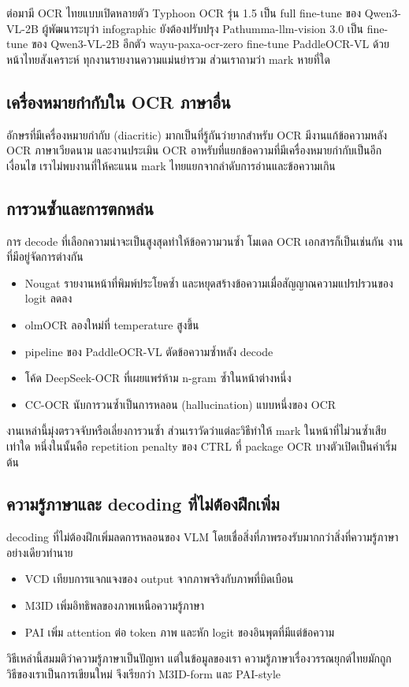 ต่อมามี OCR ไทยแบบเปิดหลายตัว Typhoon OCR \cite{nonesung2026typhoonocr} รุ่น 1.5 เป็น full fine-tune ของ Qwen3-VL-2B \cite{bai2025qwen3vl} ผู้พัฒนาระบุว่า infographic ยังต้องปรับปรุง Pathumma-llm-vision 3.0 \cite{nectec2026pathumma} เป็น fine-tune ของ Qwen3-VL-2B อีกตัว wayu-paxa-ocr-zero \cite{pipatanakul2026synthetic} fine-tune PaddleOCR-VL \cite{cui2025paddleocrvl} ด้วยหน้าไทยสังเคราะห์ ทุกงานรายงานความแม่นยำรวม ส่วนเราถามว่า mark หายที่ใด

\subsection{เครื่องหมายกำกับใน OCR ภาษาอื่น}
อักษรที่มีเครื่องหมายกำกับ (diacritic) มากเป็นที่รู้กันว่ายากสำหรับ OCR มีงานแก้ข้อความหลัง OCR ภาษาเวียดนาม \cite{do2025reference} และงานประเมิน OCR อาหรับที่แยกข้อความที่มีเครื่องหมายกำกับเป็นอีกเงื่อนไข \cite{elsafty2025arabic} เราไม่พบงานที่ให้คะแนน mark ไทยแยกจากลำดับการอ่านและข้อความเกิน

\subsection{การวนซ้ำและการตกหล่น}
การ decode ที่เลือกความน่าจะเป็นสูงสุดทำให้ข้อความวนซ้ำ \cite{holtzman2020curious} โมเดล OCR เอกสารก็เป็นเช่นกัน งานที่มีอยู่จัดการต่างกัน
\begin{itemize}
\item Nougat รายงานหน้าที่พิมพ์ประโยคซ้ำ และหยุดสร้างข้อความเมื่อสัญญาณความแปรปรวนของ logit ลดลง \cite{blecher2024nougat}
\item olmOCR ลองใหม่ที่ temperature สูงขึ้น \cite{poznanski2025olmocr}
\item pipeline ของ PaddleOCR-VL ตัดข้อความซ้ำหลัง decode \cite{paddlex2025truncate}
\item โค้ด DeepSeek-OCR ที่เผยแพร่ห้าม n-gram ซ้ำในหน้าต่างหนึ่ง \cite{deepseekocr2025code,wei2025deepseekocr}
\item CC-OCR นับการวนซ้ำเป็นการหลอน (hallucination) แบบหนึ่งของ OCR \cite{yang2025ccocr}
\end{itemize}
งานเหล่านี้มุ่งตรวจจับหรือเลี่ยงการวนซ้ำ ส่วนเราวัดว่าแต่ละวิธีทำให้ mark ในหน้าที่ไม่วนซ้ำเสียเท่าใด หนึ่งในนั้นคือ repetition penalty ของ CTRL \cite{keskar2019ctrl} ที่ package OCR บางตัวเปิดเป็นค่าเริ่มต้น

\subsection{ความรู้ภาษาและ decoding ที่ไม่ต้องฝึกเพิ่ม}
decoding ที่ไม่ต้องฝึกเพิ่มลดการหลอนของ VLM โดยเชื่อสิ่งที่ภาพรองรับมากกว่าสิ่งที่ความรู้ภาษาอย่างเดียวทำนาย
\begin{itemize}
\item VCD \cite{leng2024vcd} เทียบการแจกแจงของ output จากภาพจริงกับภาพที่บิดเบือน
\item M3ID \cite{favero2024m3id} เพิ่มอิทธิพลของภาพเหนือความรู้ภาษา
\item PAI \cite{liu2024pai} เพิ่ม attention ต่อ token ภาพ และหัก logit ของอินพุตที่มีแต่ข้อความ
\end{itemize}
วิธีเหล่านี้สมมติว่าความรู้ภาษาเป็นปัญหา แต่ในข้อมูลของเรา ความรู้ภาษาเรื่องวรรณยุกต์ไทยมักถูก วิธีของเราเป็นการเขียนใหม่ จึงเรียกว่า M3ID-form และ PAI-style 

